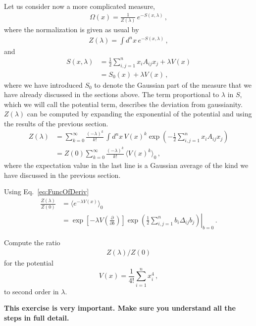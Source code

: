 Let us consider now a more complicated measure, 
\begin{align}
  \label{eq:PertGaussMeas}
  \Omega(x) = \frac{1}{Z(\lambda)}\, e^{-S(x,\lambda)}\, ,
\end{align}
where the normalization is given as usual by
\begin{align}
  \label{eq:PertGaussNorm}
  Z(\lambda) = \int d^nx\, e^{-S(x,\lambda)}\, ,
\end{align}
and 
\begin{align}
  \label{eq:PertGaussAction}
  S(x,\lambda) &= \frac12 \sum_{i,j=1}^n x_i A_{ij} x_j + 
  \lambda V(x) \\
  &= S_0(x) + \lambda V(x)\, ,
\end{align}
where we have introduced $S_0$ to denote the Gaussian part of the
measure that we have already discussed in the sections above.  The
term proportional to $\lambda$ in $S$, which we will call the
potential term, describes the deviation from gaussianity.
$Z(\lambda)$ can be computed by expanding the exponential of the
potential and using the results of the previous section.
\begin{align}
  Z(\lambda) &= \sum_{k=0}^\infty \frac{(-\lambda)^k}{k!}\, 
               \int d^nx\, V(x)^k  \exp\left(
    -\frac12 \sum_{i,j=1}^n x_i A_{ij} x_j
    \right) \\
  &= Z(0) \sum_{k=0}^\infty \frac{(-\lambda)^k}{k!}\,
    \langle V(x)^k\rangle_0\, ,
\end{align}
where the expectation value in the last line is a Gaussian average of the kind we have discussed in the previous section. 

Using Eq.~\ref{eq:FuncOfDeriv} 
\begin{align}
  \frac{Z(\lambda)}{Z(0)} &= \langle e^{-\lambda V(x)} \rangle_0 \\
  &= \exp\left[-\lambda V\left(\frac{\partial}{\partial b}\right)\right]
    \left. \exp\left(
    \frac12 \sum_{i,j=1}^n b_i \Delta_{ij} b_j
  \right) \right|_{b=0}\, .
\end{align}

\begin{Ex}
  Compute the ratio 
\begin{align}
  Z(\lambda)/Z(0)
\end{align}
for the potential 
\begin{equation}
  \label{eq:QuarticPot}
  V(x) = \frac{1}{4!} \sum_{i=1}^n x_i^4\, ,
\end{equation}
to second order in $\lambda$.

\noindent\textbf{ 
This exercise is very important. Make sure you understand all the steps in full detail. }
\end{Ex}

